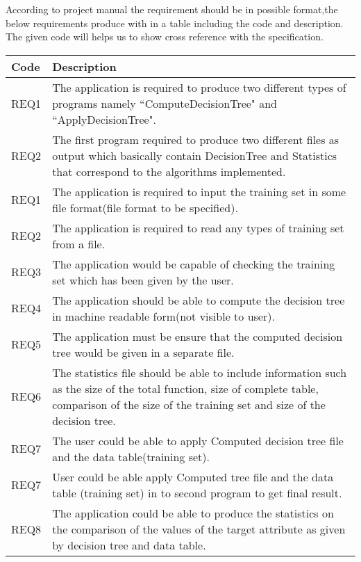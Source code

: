 \documentclass{report}
\begin{document}
According to project manual the requirement should be in possible format,the below requirements produce with in a table including the code and description. 
The given code will helps us to show cross reference with the specification.\\

\begin{tabularx}{\textwidth}{|l|X|}
\hline
Code & Description\\
\hline
\hline 
REQ1&
The application is required to produce two different types of programs namely ``ComputeDecisionTree" and ``ApplyDecisionTree".
\\\hline
REQ2&
The first program required to  produce two different files as output which basically contain DecisionTree and Statistics that correspond to the algorithms implemented.
\\\hline

REQ1&
The application is required to input the training set in some file format(file format to be specified).
\\\hline

REQ2&
The application is required to read any types of training set from a file.
\\\hline

REQ3&

The application would be capable of checking the training set which has been given by the user.
\\\hline

REQ4&

The application should be able to compute the decision tree in machine readable form(not visible to user).
\\\hline

REQ5&

The application must be ensure that the computed decision tree would be given in a separate file.
\\\hline

REQ6&

The statistics file should be able to include information such as the size of the total function, size of complete table, comparison of the size of the training set and size of the decision tree.
\\\hline

REQ7&

The user could be able to apply Computed decision tree file and the data table(training set).
\\\hline

REQ7&

User could be able apply Computed tree file and the data table (training set) in to second program to get final result.
\\\hline

REQ8&

The application could be able to produce the statistics on the comparison of the values of the target attribute as given by decision tree and data table.
\\\hline

\end{tabularx}
\end{document}
